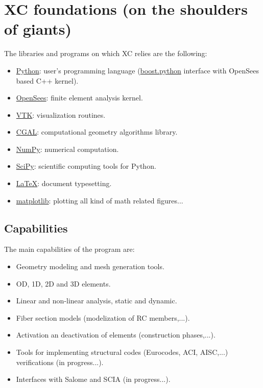 \section{XC foundations (on the shoulders of giants)}
The libraries and programs on which XC relies are the following:

\begin{itemize}
  \item \href{https://www.python.org/}{Python}: user's programming language (\href{https://wiki.python.org/moin/boost.python}{boost.python} interface with OpenSees based C++ kernel).
  \item \href{http://opensees.berkeley.edu}{OpenSees}: finite element analysis kernel.
  \item \href{http://www.vtk.org/}{VTK}: visualization routines.
  \item \href{http://www.cgal.org/}{CGAL}: computational geometry algorithms library.
  \item \href{http://www.numpy.org/}{NumPy}: numerical computation.
  \item \href{https://www.scipy.org/}{SciPy}: scientific computing tools for Python.
  \item \href{https://www.latex-project.org/}{LaTeX}: document typesetting.
  \item \href{http://matplotlib.org/}{matplotlib}: plotting all kind of math related figures...
\end{itemize}

\subsection{Capabilities}
The main capabilities of the program are:

\begin{itemize}
  \item Geometry modeling and mesh generation tools.
  \item OD, 1D, 2D and 3D elements.
  \item Linear and non-linear analysis, static and dynamic.
  \item Fiber section models (modelization of RC members,...).
  \item Activation an deactivation of elements (construction phases,...).
  \item Tools for implementing structural codes (Eurocodes, ACI, AISC,...) verifications (in progress...).
  \item Interfaces with Salome and SCIA (in progress...).
\end{itemize}

